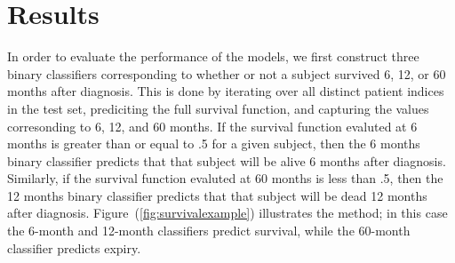 \documentclass[10pt,letterpaper]{article}
\begin{document}



\section*{Results}
\label{sec:results}


In order to evaluate the performance of the models, we first construct three binary classifiers corresponding to whether or not a subject survived 6, 12, or 60 months after diagnosis. 
This is done by iterating over all distinct patient indices in the test set, prediciting the full survival function, and capturing the values corresonding to 6, 12, and 60 months.  
If the survival function evaluted at 6 months is greater than or equal to .5 for a given subject, then the 6 months binary classifier predicts that that subject will be alive 6 months after diagnosis. Similarly, if the survival function evaluted at 60 months is less than .5, then the 12 months binary classifier predicts that that subject will be dead 12 months after diagnosis. Figure~(\ref{fig:survivalexample}) illustrates the method; in this case the 6-month and 12-month classifiers predict survival, while the 60-month classifier predicts expiry.
\end{document}
